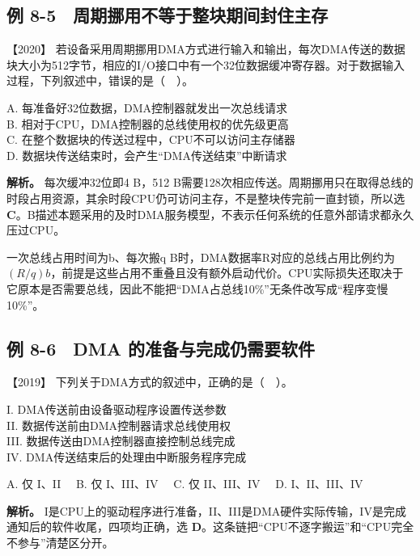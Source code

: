 \subsection{例 8-5　周期挪用不等于整块期间封住主存}\label{co-ex8-5}

\noindent{}【2020】 若设备采用周期挪用DMA方式进行输入和输出，每次DMA传送的数据块大小为512字节，相应的I/O接口中有一个32位数据缓冲寄存器。对于数据输入过程，下列叙述中，错误的是（　）。

A. 每准备好32位数据，DMA控制器就发出一次总线请求\\
B. 相对于CPU，DMA控制器的总线使用权的优先级更高\\
C. 在整个数据块的传送过程中，CPU不可以访问主存储器\\
D. 数据块传送结束时，会产生``DMA传送结束''中断请求


\textbf{解析。} 每次缓冲32位即4 B，512 B需要128次相应传送。周期挪用只在取得总线的时段占用资源，其余时段CPU仍可访问主存，不是整块传完前一直封锁，所以选 \textbf{C}。B描述本题采用的及时DMA服务模型，不表示任何系统的任意外部请求都永久压过CPU。

一次总线占用时间为b、每次搬q B时，DMA数据率R对应的总线占用比例约为 \((R/q)b\)，前提是这些占用不重叠且没有额外启动代价。CPU实际损失还取决于它原本是否需要总线，因此不能把``DMA占总线10\%''无条件改写成``程序变慢10\%''。

\subsection{例 8-6　DMA 的准备与完成仍需要软件}\label{co-ex8-6}

\noindent{}【2019】 下列关于DMA方式的叙述中，正确的是（　）。

I. DMA传送前由设备驱动程序设置传送参数\\
II. 数据传送前由DMA控制器请求总线使用权\\
III. 数据传送由DMA控制器直接控制总线完成\\
IV. DMA传送结束后的处理由中断服务程序完成

A. 仅 I、II　 B. 仅 I、III、IV　 C. 仅 II、III、IV　 D. I、II、III、IV


\textbf{解析。} I是CPU上的驱动程序进行准备，II、III是DMA硬件实际传输，IV是完成通知后的软件收尾，四项均正确，选 \textbf{D}。这条链把``CPU不逐字搬运''和``CPU完全不参与''清楚区分开。

